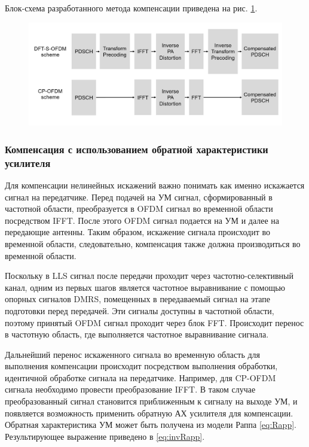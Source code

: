 Блок-схема разработанного метода компенсации приведена на рис.
\ref{fig:compensation_scheme}. 

\begin{figure}[h!]
    \centering
    \includegraphics[width=0.95\linewidth]{figs/compensation_scheme.png}
    \caption{}
    \label{fig:compensation_scheme}
\end{figure}


\subsubsection{Компенсация с использованием обратной характеристики усилителя}

Для компенсации нелинейных искажений важно понимать как именно искажается
сигнал на передатчике. Перед подачей на УМ сигнал, сформированный в
частотной области, преобразуется в OFDM сигнал во временной области
посредством IFFT. После этого OFDM сигнал подается на УМ и далее на
передающие антенны. Таким образом, искажение сигнала происходит во
временной области, следовательно, компенсация также должна производиться во
временной области. 

Поскольку в LLS сигнал после передачи проходит через частотно-селективный
канал, одним из первых шагов является частотное выравнивание с
помощью опорных сигналов DMRS, помещенных в передаваемый сигнал на этапе
подготовки перед передачей. Эти сигналы доступны в частотной области,
поэтому принятый OFDM сигнал проходит через блок FFT. Происходит перенос в
частотную область, где выполняется частотное выравнивание сигнала.

Дальнейший перенос искаженного сигнала во временную область для выполнения
компенсации происходит посредством выполнения обработки, идентичной
обработке сигнала на передатчике. Например, для CP-OFDM сигнала необходимо
провести преобразование IFFT. В таком случае преобразованный сигнал
становится приближенным к сигналу на выходе УМ, и появляется возможность
применить обратную АХ усилителя для компенсации. Обратная характеристика УМ
может быть получена из модели Раппа \ref{eq:Rapp}. Результирующее выражение
приведено в \ref{eq:invRapp}.


